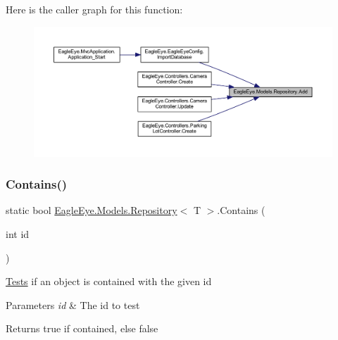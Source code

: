 Here is the caller graph for this function\+:\nopagebreak
\begin{figure}[H]
\begin{center}
\leavevmode
\includegraphics[width=350pt]{class_eagle_eye_1_1_models_1_1_repository_aca9fded0480d870f0ec7837700243a2b_icgraph}
\end{center}
\end{figure}
\mbox{\label{class_eagle_eye_1_1_models_1_1_repository_ad94aecd681043ac78cd50dcde4aaeb0d}} 
\subsubsection{\texorpdfstring{Contains()}{Contains()}}
{\footnotesize\ttfamily static bool \mbox{\hyperlink{class_eagle_eye_1_1_models_1_1_repository}{Eagle\+Eye.\+Models.\+Repository}}$<$ T $>$.Contains (\begin{DoxyParamCaption}\item[{int}]{id }\end{DoxyParamCaption})\hspace{0.3cm}{\ttfamily [static]}}



\mbox{\hyperlink{namespace_eagle_eye_1_1_tests}{Tests}} if an object is contained with the given id 


\begin{DoxyParams}{Parameters}
{\em id} & The id to test\\
\hline
\end{DoxyParams}
\begin{DoxyReturn}{Returns}
true if contained, else false
\end{DoxyReturn}
\mbox{\label{class_eagle_eye_1_1_models_1_1_repository_ad50f201c8f5f1c7794ddf068ed459854}} 

